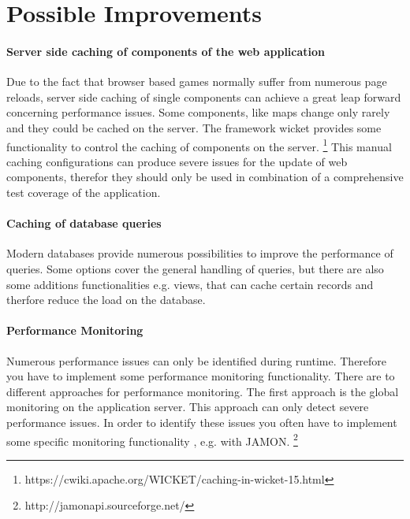 \documentclass[a4paper]{article}
\begin{document}
\section{Possible Improvements}
\paragraph{Server side caching of components of the web application}
Due to the fact that browser based games normally suffer from numerous page reloads, server side caching of single components can achieve a great leap forward concerning performance issues. Some components, like maps change only rarely and they could be cached on the server. The framework wicket provides some functionality to control the caching of components on the server. \footnote{https://cwiki.apache.org/WICKET/caching-in-wicket-15.html} This manual caching configurations can produce severe issues for the update of web components, therefor they should only be used in combination of a comprehensive test coverage of the application.

\paragraph{Caching of database queries}
Modern databases provide numerous possibilities to improve the performance of queries. Some options cover the general handling of queries, but there are also some additions functionalities e.g. views, that can cache certain records and therfore reduce the load on the database.

\paragraph{Performance Monitoring}
Numerous performance issues can only be identified during runtime. Therefore you have to implement some performance monitoring functionality. There are to different approaches for performance monitoring. The first approach is the global monitoring on the application server. This approach can only detect severe performance issues. In order to identify these issues you often have to implement some specific monitoring functionality , e.g. with JAMON. \footnote{http://jamonapi.sourceforge.net/}
\end{document}
